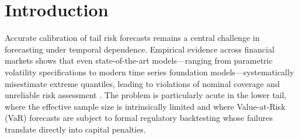 \documentclass[preprint,11pt,authoryear]{elsarticle}
\newcommand{\1}{\boldsymbol{1}}
\begin{document}
\begin{frontmatter}
\begin{abstract}
			The method is evaluated on five time series foundation models and four classical benchmarks across 24 financial assets over 2000--2026. Conformal recalibration empirically restores nominal coverage across a wide range of model--asset combinations, achieving broad Basel Green Zone compliance with the static split---stronger among model--asset pairs where the base forecast retains predictive content---and near-full compliance with the rolling variant, revealing a calibration--efficiency trade-off. The results establish that forecast validity can be separated from forecast generation: a one-parameter, distribution-free post-processing layer empirically restores tail coverage without modifying the underlying predictive model.

			\bigskip\noindent
			\textbf{Keywords:} Conformal prediction; probabilistic forecast calibration; Value at Risk; time series foundation models; distribution-free recalibration; temporal dependence; quantile score

			\bigskip\noindent
			\textbf{JEL:} C14\,|\,C53\,|\,C58\,|\,G17\,|\,G32
		\end{abstract}
		
	\end{frontmatter}
	
	\section{Introduction}
	\label{sec:intro}

	Accurate calibration of tail risk forecasts remains a central challenge in forecasting under temporal dependence. Empirical evidence across financial markets shows that even state-of-the-art models---ranging from parametric volatility specifications to modern time series foundation models---systematically misestimate extreme quantiles, leading to violations of nominal coverage and unreliable risk assessment \citep{christoffersen1998, nolde2017elicitability, goel2024tsfmvar, pele2025llmvar}. The problem is particularly acute in the lower tail, where the effective sample size is intrinsically limited and where Value-at-Risk (VaR) forecasts are subject to formal regulatory backtesting \citep{basel1996} whose failures translate directly into capital penalties.
\end{document}
